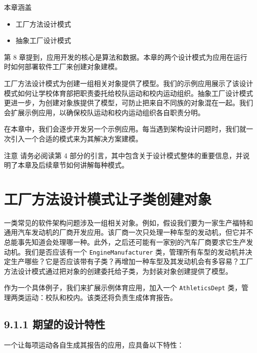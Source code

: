 \begin{myChapterIntro}{本章涵盖}
\begin{itemize}
\item 工厂方法设计模式
\item 抽象工厂设计模式
\end{itemize}
\end{myChapterIntro}

第 8 章提到，应用开发的核心是算法和数据。本章的两个设计模式为应用在运行时如何部署软件工厂来创建对象建模。


工厂方法设计模式为创建一组相关对象提供了模型。我们的示例应用展示了该设计模式如何让学校体育部把职责委托给校队运动和校内运动组织。抽象工厂设计模式更进一步，为创建对象族提供了模型，可防止把来自不同族的对象混在一起。我们会扩展示例应用，以确保校队运动和校内运动组织各自职责分明。

在本章中，我们会逐步开发另一个示例应用。每当遇到架构设计问题时，我们就一次引入一个合适的模式来为其解决方案建模。

\begin{myWarning}{注意}
请务必阅读第 4 部分的引言，其中包含关于设计模式整体的重要信息，并说明了本章及后续章节如何讲解每种模式。
\end{myWarning}

\section{工厂方法设计模式让子类创建对象}

一类常见的软件架构问题涉及一组相关对象。例如，假设我们要为一家生产福特和通用汽车发动机的厂商开发应用。该厂商一次只处理一种车型的发动机，但它并不总能事先知道会处理哪一种。此外，之后还可能有一家别的汽车厂商要求它生产发动机。我们是否应该有一个 \texttt{Engine\allowbreak{}Manufacturer} 类，管理所有车型的发动机并决定生产哪些？它是否应该带有子类？再增加一种车型及其发动机会有多容易？工厂方法设计模式通过把对象的创建委托给子类，为封装对象创建提供了模型。

作为一个具体例子，我们来扩展示例体育应用，加入一个 \texttt{Athletics\allowbreak{}Dept} 类，管理两类运动：校队和校内。该类还将负责生成体育报告。

\subsection{9.1.1 期望的设计特性}

一个让每项运动各自生成其报告的应用，应具备以下特性：

